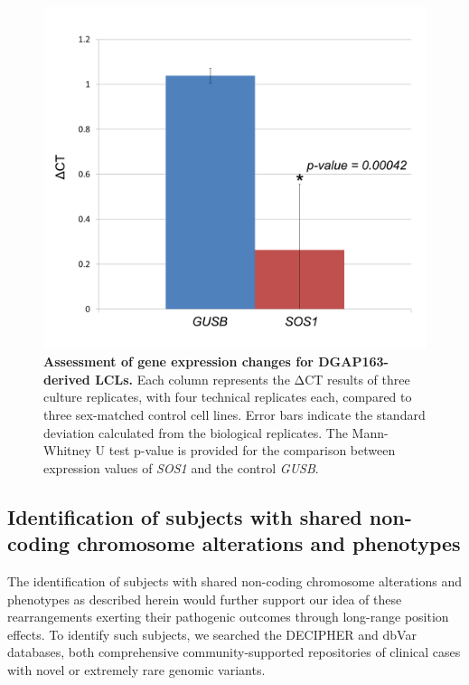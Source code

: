\documentclass[a4paper,twoside=true,openright,parskip=full,chapterprefix=true,11pt,headings=normal,bibliography=totoc,listof=totoc,titlepage=on,captions=tableabove,draft=false]{scrreprt}
\theoremstyle{definition}
\theoremstyle{definition}
\theoremstyle{definition}
\theoremstyle{remark}
\begin{document}
\begin{figure}

{\centering \includegraphics[width=0.5\linewidth]{figures/position_effect/Figure2} 

}

\caption{\textbf{Assessment of gene expression changes
for DGAP163-derived LCLs.} Each column represents the ΔCT results of
three culture replicates, with four technical replicates each, compared
to three sex-matched control cell lines. Error bars indicate the
standard deviation calculated from the biological replicates. The
Mann-Whitney U test p-value is provided for the comparison between
expression values of \emph{SOS1} and the control \emph{GUSB}.}\label{fig:position-effect-2}
\end{figure}









\hypertarget{identification-of-subjects-with-shared-non-coding-chromosome-alterations-and-phenotypes}{%
\subsection{Identification of subjects with shared non-coding chromosome
alterations and
phenotypes}\label{identification-of-subjects-with-shared-non-coding-chromosome-alterations-and-phenotypes}}

The identification of subjects with shared non-coding chromosome
alterations and phenotypes as described herein would further support our
idea of these rearrangements exerting their pathogenic outcomes through
long-range position effects. To identify such subjects, we searched the
DECIPHER\citep{Firth2009} and dbVar databases,\citep{Lappalainen2013}
both comprehensive community-supported repositories of clinical cases
with novel or extremely rare genomic variants.
\end{document}
